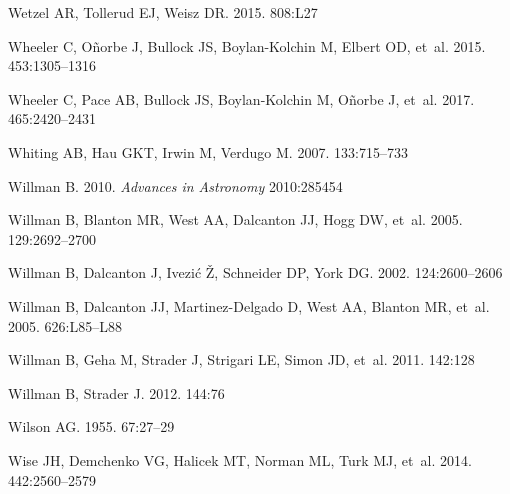 \documentclass[a4paper]{ar-1col}
\begin{document}
\begin{thebibliography}{}
{Wetzel} AR, {Tollerud} EJ, {Weisz} DR. 2015.
\textit{\apjl} 808:L27

{Wheeler} C, {O{\~n}orbe} J, {Bullock} JS, {Boylan-Kolchin} M, {Elbert} OD,
  et~al. 2015.
\textit{\mnras} 453:1305--1316

{Wheeler} C, {Pace} AB, {Bullock} JS, {Boylan-Kolchin} M, {O{\~n}orbe} J,
  et~al. 2017.
\textit{\mnras} 465:2420--2431

{Whiting} AB, {Hau} GKT, {Irwin} M, {Verdugo} M. 2007.
\textit{\aj} 133:715--733

{Willman} B. 2010.
\textit{Advances in Astronomy} 2010:285454

{Willman} B, {Blanton} MR, {West} AA, {Dalcanton} JJ, {Hogg} DW, et~al.
  2005{}.
\textit{\aj} 129:2692--2700

{Willman} B, {Dalcanton} J, {Ivezi{\'c}} {\v Z}, {Schneider} DP, {York} DG.
  2002.
\textit{\aj} 124:2600--2606

{Willman} B, {Dalcanton} JJ, {Martinez-Delgado} D, {West} AA, {Blanton} MR,
  et~al. 2005{}.
\textit{\apjl} 626:L85--L88

{Willman} B, {Geha} M, {Strader} J, {Strigari} LE, {Simon} JD, et~al. 2011.
\textit{\aj} 142:128

{Willman} B, {Strader} J. 2012.
\textit{\aj} 144:76

{Wilson} AG. 1955.
\textit{\pasp} 67:27--29

{Wise} JH, {Demchenko} VG, {Halicek} MT, {Norman} ML, {Turk} MJ, et~al. 2014.
\textit{\mnras} 442:2560--2579


\end{thebibliography}
\end{document}
